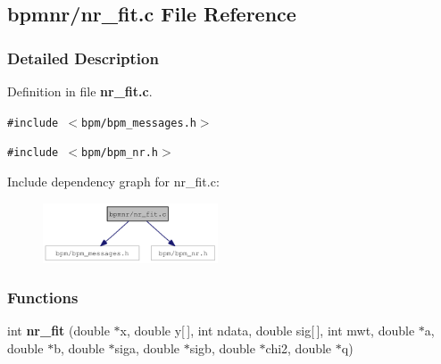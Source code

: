 \subsection{bpmnr/nr\_\-fit.c File Reference}
\label{nr__fit_8c}


\subsubsection{Detailed Description}


Definition in file {\bf nr\_\-fit.c}.

{\tt \#include $<$bpm/bpm\_\-messages.h$>$}\par
{\tt \#include $<$bpm/bpm\_\-nr.h$>$}\par


Include dependency graph for nr\_\-fit.c:\nopagebreak
\begin{figure}[H]
\begin{center}
\leavevmode
\includegraphics[width=147pt]{nr__fit_8c__incl}
\end{center}
\end{figure}
\subsubsection*{Functions}
\begin{CompactItemize}
\item 
int {\bf nr\_\-fit} (double $\ast$x, double y[$\,$], int ndata, double sig[$\,$], int mwt, double $\ast$a, double $\ast$b, double $\ast$siga, double $\ast$sigb, double $\ast$chi2, double $\ast$q)
\end{CompactItemize}
